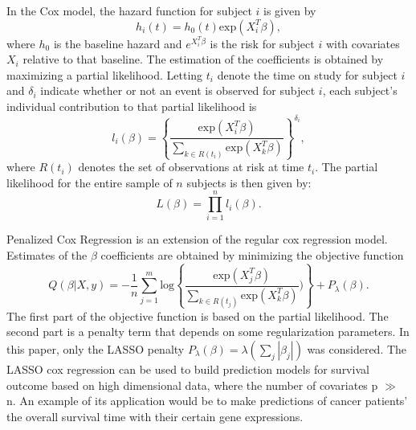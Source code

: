 In the Cox model, the hazard function for subject $i$ is given by 
\begin{equation}
  h_{i}(t) = h_{0}(t) \text{exp}( X_{i}^{T} \beta),
\end{equation} 
where $h_{0}$ is the baseline hazard and $e^{X_i^{T} \beta}$ is the risk for subject $i$ with covariates $X_i$ relative to that baseline.  The estimation of the coefficients is obtained by maximizing a partial likelihood.  Letting $t_i$ denote the time on study for subject $i$ and $\delta_{i}$ indicate whether or not an event is observed for subject $i$, each subject's individual contribution to that partial likelihood is
\begin{equation}
  l_{i}(\beta) = \left \{\frac{\text{exp} ( X_{i}^{T} \beta)}{\sum_{ k \in R(t_{i})}\text{exp} ( X_{k}^{T} \beta)}\right \}^{\delta_{i}},
\end{equation}
where $R(t_{i})$ denotes the set of observations at risk at time $t_{i}$.  The partial likelihood for the entire sample of $n$ subjects is then given by:
\begin{equation}
  L(\beta) =\prod_{i = 1}^{n} l_{i}(\beta).
\end{equation}



Penalized Cox Regression is an extension of the regular cox regression model. Estimates of the $\beta$ coefficients are obtained by minimizing the objective function
\begin{equation}
  Q(\beta |X, y) = - \frac{1}{n}  \sum_{j=1}^{m} \text{log} \left \{\frac{\text{exp} ( X_{j}^{T} \beta)}{\sum_{ k \in R(t_{j})}\text{exp} ( X_{k}^{T} \beta)}) \right \} + P_{\lambda}(\beta).
\end{equation}
The first part of the objective function is based on the partial likelihood. The second part is a penalty term that depends on some regularization parameters. In this paper, only the LASSO penalty $P_{\lambda}(\beta) = \lambda (\sum_{j} |\beta_{j}|)$ was considered. The LASSO cox regression can be used to build prediction models for survival outcome based on high dimensional data, where the number of covariates p $\gg$ n. An example of its application would be to make predictions of cancer patients' the overall survival time with their certain gene expressions.

